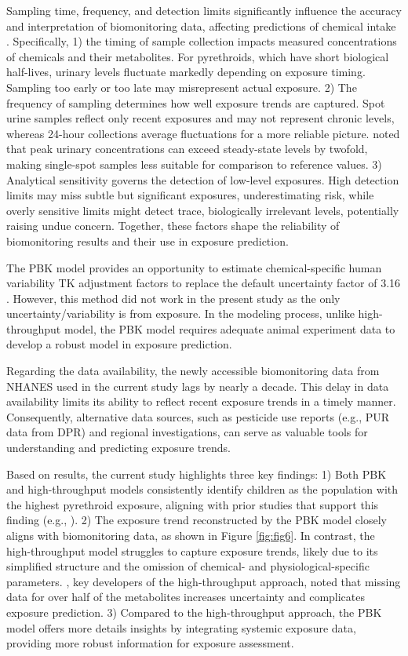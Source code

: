 \documentclass[toxics,article,submit,pdftex,moreauthors]{Definitions/mdpi}
\begin{document}
Sampling time, frequency, and detection limits significantly influence the
accuracy and interpretation of biomonitoring data, affecting predictions of
chemical intake \citep{hays2007biomonitoring}. Specifically, 1) the timing of
sample collection impacts measured concentrations of chemicals and their
metabolites. For pyrethroids, which have short biological half-lives, urinary
levels fluctuate markedly depending on exposure timing. Sampling too early or
too late may misrepresent actual exposure. 2) The frequency of sampling
determines how well exposure trends are captured. Spot urine samples reflect
only recent exposures and may not represent chronic levels, whereas 24-hour
collections average fluctuations for a more reliable picture.
\citet{hays2007biomonitoring} noted that peak urinary concentrations can exceed
steady-state levels by twofold, making single-spot samples less suitable for
comparison to reference values. 3) Analytical sensitivity governs the detection
of low-level exposures. High detection limits may miss subtle but significant
exposures, underestimating risk, while overly sensitive limits might detect
trace, biologically irrelevant levels, potentially raising undue concern.
Together, these factors shape the reliability of biomonitoring results and
their use in exposure prediction.

The PBK model provides an opportunity to estimate chemical-specific human
variability TK adjustment factors to replace the default uncertainty factor of
3.16 \citep{chiu_advancing_2018}. However, this method did not work in the
present study as the only uncertainty/variability is from exposure. In the
modeling process, unlike high-throughput model, the PBK model requires adequate
animal experiment data to develop a robust model in exposure prediction.

Regarding the data availability, the newly accessible biomonitoring
data from NHANES used in the current study lags by nearly a decade. This
delay in data availability limits its ability to reflect recent exposure
trends in a timely manner. Consequently, alternative data sources, such
as pesticide use reports (e.g., PUR data from DPR) and
regional investigations, can serve as valuable tools for understanding
and predicting exposure trends.

Based on results, the current study highlights three key findings: 1) Both 
PBK and high-throughput models consistently identify children
as the population with the highest pyrethroid exposure, aligning with prior
studies that support this finding (e.g., \citep{barr2010urinary}). 2) The
exposure trend reconstructed by the PBK model closely aligns with biomonitoring
data, as shown in Figure \ref{fig:fig6}. In contrast, the high-throughput model struggles to
capture exposure trends, likely due to its simplified structure and the omission of
chemical- and physiological-specific parameters. \citet{stanfield2022bayesian}, key
developers of the high-throughput approach, noted that missing data for over
half of the metabolites increases uncertainty and complicates exposure
prediction. 3) Compared to the high-throughput approach, the PBK model offers more
details insights by integrating systemic exposure data, providing more
robust information for exposure assessment.
\end{document}
